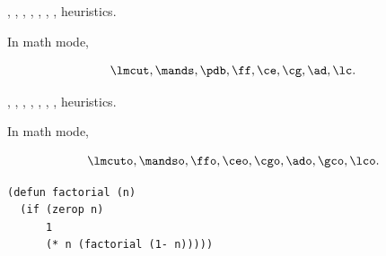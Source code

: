 \lmcut, \mands, \pdb, \ff, \ce, \cg, \ad, \lc heuristics.

In math mode,

\[
 \lmcut, \mands, \pdb, \ff, \ce, \cg, \ad, \lc.
\]

\lmcuto, \mandso, \ffo, \ceo, \cgo, \ado, \gco, \lco heuristics.

In math mode,

\[
 \lmcuto, \mandso, \ffo, \ceo, \cgo, \ado, \gco, \lco.
\]

\begin{verbatim}
(defun factorial (n)
  (if (zerop n)
      1
      (* n (factorial (1- n)))))
\end{verbatim}

